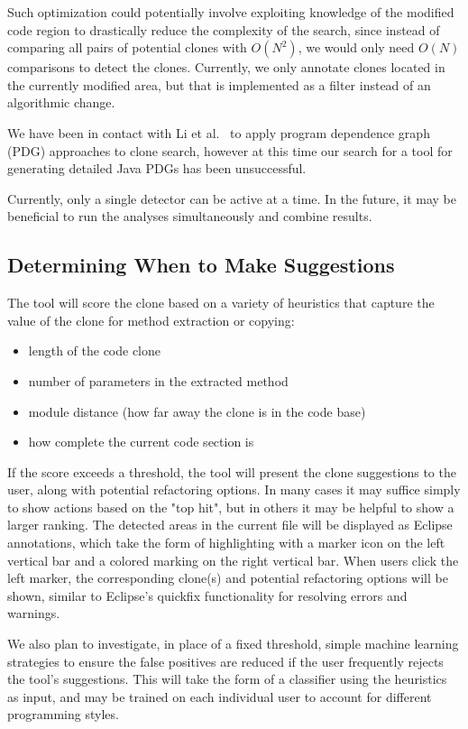 \documentclass[preprint,10pt]{sigplanconf}
\begin{document}
Such optimization could potentially involve exploiting knowledge of the 
modified code region to drastically reduce the complexity of the search,
 since instead of comparing all pairs of potential clones with $O(N^2)$, 
we would only need $O(N)$ comparisons to detect the clones. Currently, 
we only annotate clones located in the currently modified area, but
that is implemented as a filter instead of an algorithmic change.

We have been in contact with Li et al.~\cite{LiE2011} to apply program
dependence graph (PDG) approaches to clone search, however at this
time our search for a tool for generating detailed Java PDGs has been
unsuccessful.

Currently, only a single detector can be active at a time. In the
future, it may be beneficial to run the analyses simultaneously and
combine results.

\subsection{Determining When to Make Suggestions}
The tool will score the clone based on a variety of heuristics that
capture the value of the clone for method extraction or copying:

\begin{itemize}
  \item length of the code clone
  \item number of parameters in the extracted method
  \item module distance (how far away the clone is in the code base)
  \item how complete the current code section is
\end{itemize}

If the score exceeds a threshold, the tool will present the 
clone suggestions to the user, along with potential refactoring options.  
In many cases it may suffice simply to show actions based on the "top 
hit", but in others it may be helpful to show a larger ranking.  The detected 
areas in the current file will be displayed as Eclipse annotations, which take 
the form of highlighting with a marker icon on the left vertical bar and a 
colored marking on the right vertical bar.  When users click the left marker,
the corresponding clone(s) and potential refactoring options will be shown, 
similar to Eclipse's quickfix functionality for resolving errors and warnings.


 We also plan to investigate, in place of a
fixed threshold, simple machine learning strategies to ensure the
false positives are reduced if the user frequently rejects the tool's
suggestions.  This will take the form of a classifier using the
heuristics as input, and may be trained on each individual user to
account for different programming styles.
\end{document}
